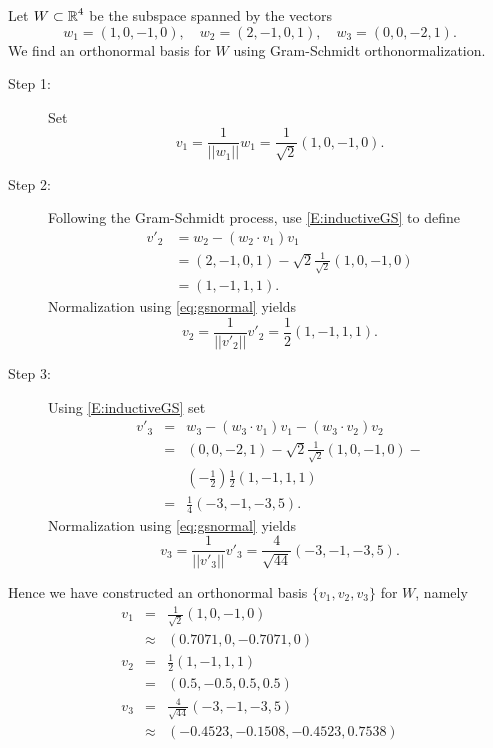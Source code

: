\documentclass{ximera}
\begin{document}
Let $W\subset\mbox{$\Bbb{R}$}^4$ be the subspace spanned by the vectors
\begin{equation}  \label{eq:gsexam}
w_1=(1,0,-1,0),\quad w_2=(2,-1,0,1),\quad w_3=(0,0,-2,1).
\end{equation}
We find an orthonormal basis for $W$ using Gram-Schmidt orthonormalization.

\begin{description}
\item[Step 1:]   Set
\[
v_1 = \frac{1}{||w_1||}w_1=\frac{1}{\sqrt{2}}(1,0,-1,0).
\]
\item[Step 2:] Following the Gram-Schmidt process, use \eqref{E:inductiveGS} to
define
\begin{align*}
  v'_2 &= w_2-(w_2\cdot v_1)v_1 \\
  &= (2,-1,0,1)-\sqrt{2}\frac{1}{\sqrt{2}}(1,0,-1,0) \\
  &=(1,-1,1,1).
\end{align*}
Normalization using \eqref{eq:gsnormal} yields
\[
v_2 = \frac{1}{||v'_2||}v'_2 = \frac{1}{2}(1,-1,1,1).
\]
\item[Step 3:] Using \eqref{E:inductiveGS} set
\begin{eqnarray*}
v'_3 &=& w_3-(w_3\cdot v_1)v_1-(w_3\cdot v_2)v_2\\
     &=&(0,0,-2,1) - \sqrt{2}\frac{1}{\sqrt{2}}(1,0,-1,0) - \\
         & & \left(-\frac{1}{2}\right)\frac{1}{2}(1,-1,1,1)\\
&=&\frac{1}{4}(-3,-1,-3,5).
\end{eqnarray*}
Normalization using \eqref{eq:gsnormal} yields
\[
v_3 = \frac{1}{||v'_3||}v'_3 = \frac{4}{\sqrt{44}}(-3,-1,-3,5).
\]
\end{description}

Hence we have constructed an orthonormal basis $\{v_1,v_2,v_3\}$ for $W$,
namely
\begin{equation}
\label{eq:gsoresult}
\begin{array}{rcccl}
  v_1 & = & \frac{1}{\sqrt{2}}(1,0,-1,0) \\
      & \approx & (0.7071,0,-0.7071,0)\\
  v_2 & = & \frac{1}{2}(1,-1,1,1) \\
    & = & (0.5,-0.5,0.5,0.5)\\
  v_3 & = & \frac{4}{\sqrt{44}}(-3,-1,-3,5) \\
    & \approx & (-0.4523,-0.1508,-0.4523,0.7538)
\end{array}
\end{equation}


\EXER

\end{document}
